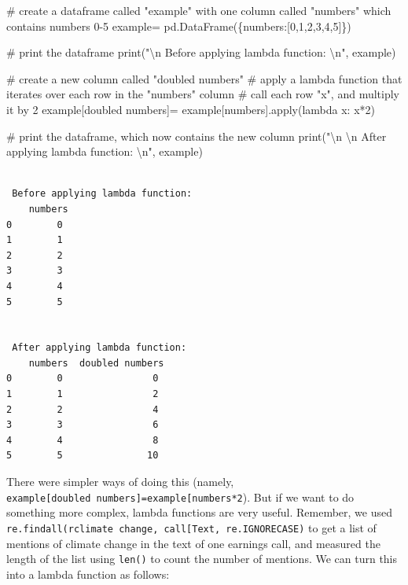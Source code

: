 \documentclass[
  letterpaper,
  DIV=11,
  numbers=noendperiod]{scrreprt}
\newenvironment{Shaded}{\begin{snugshade}}{\end{snugshade}}
\newcommand{\BuiltInTok}[1]{\textcolor[rgb]{0.00,0.23,0.31}{#1}}
\newcommand{\CharTok}[1]{\textcolor[rgb]{0.13,0.47,0.30}{#1}}
\newcommand{\CommentTok}[1]{\textcolor[rgb]{0.37,0.37,0.37}{#1}}
\newcommand{\DecValTok}[1]{\textcolor[rgb]{0.68,0.00,0.00}{#1}}
\newcommand{\KeywordTok}[1]{\textcolor[rgb]{0.00,0.23,0.31}{#1}}
\newcommand{\NormalTok}[1]{\textcolor[rgb]{0.00,0.23,0.31}{#1}}
\newcommand{\OperatorTok}[1]{\textcolor[rgb]{0.37,0.37,0.37}{#1}}
\newcommand{\StringTok}[1]{\textcolor[rgb]{0.13,0.47,0.30}{#1}}
\begin{document}
\begin{Shaded}
\begin{Highlighting}[]
\CommentTok{\# create a dataframe called "example" with one column called "numbers" which contains numbers 0{-}5}
\NormalTok{example}\OperatorTok{=}\NormalTok{ pd.DataFrame(\{}\StringTok{\textquotesingle{}numbers\textquotesingle{}}\NormalTok{:[}\DecValTok{0}\NormalTok{,}\DecValTok{1}\NormalTok{,}\DecValTok{2}\NormalTok{,}\DecValTok{3}\NormalTok{,}\DecValTok{4}\NormalTok{,}\DecValTok{5}\NormalTok{]\})}

\CommentTok{\# print the dataframe }
\BuiltInTok{print}\NormalTok{(}\StringTok{"}\CharTok{\textbackslash{}n}\StringTok{ Before applying lambda function: }\CharTok{\textbackslash{}n}\StringTok{"}\NormalTok{, example)}

\CommentTok{\# create a new column called "doubled numbers"}
\CommentTok{\# apply a lambda function that iterates over each row in the "numbers" column}
\CommentTok{\# call each row "x", and multiply it by 2}
\NormalTok{example[}\StringTok{\textquotesingle{}doubled numbers\textquotesingle{}}\NormalTok{]}\OperatorTok{=}\NormalTok{ example[}\StringTok{\textquotesingle{}numbers\textquotesingle{}}\NormalTok{].}\BuiltInTok{apply}\NormalTok{(}\KeywordTok{lambda}\NormalTok{ x: x}\OperatorTok{*}\DecValTok{2}\NormalTok{)}

\CommentTok{\# print the dataframe, which now contains the new column}
\BuiltInTok{print}\NormalTok{(}\StringTok{"}\CharTok{\textbackslash{}n}\StringTok{ }\CharTok{\textbackslash{}n}\StringTok{ After applying lambda function: }\CharTok{\textbackslash{}n}\StringTok{"}\NormalTok{, example)}
\end{Highlighting}
\end{Shaded}

\begin{verbatim}

 Before applying lambda function: 
    numbers
0        0
1        1
2        2
3        3
4        4
5        5

 
 After applying lambda function: 
    numbers  doubled numbers
0        0                0
1        1                2
2        2                4
3        3                6
4        4                8
5        5               10
\end{verbatim}

There were simpler ways of doing this (namely,
\texttt{example{[}doubled\ numbers{]}=example{[}\textquotesingle{}numbers\textquotesingle{}{]}*2}).
But if we want to do something more complex, lambda functions are very
useful. Remember, we used
\texttt{re.findall(r\textquotesingle{}climate\ change\textquotesingle{},\ call{[}\textquotesingle{}Text\textquotesingle{}{]},\ re.IGNORECASE)}
to get a list of mentions of climate change in the text of one earnings
call, and measured the length of the list using \texttt{len()} to count
the number of mentions. We can turn this into a lambda function as
follows:
\end{document}
